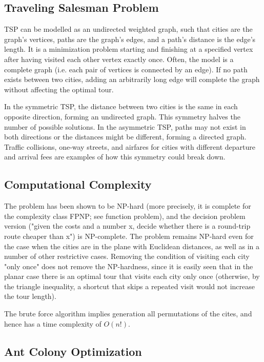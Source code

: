 \subsection{Traveling Salesman Problem}

TSP can be modelled as an undirected weighted graph, such that cities are the graph's vertices, paths are the graph's edges, and a path's distance is the edge's length. It is a minimization problem starting and finishing at a specified vertex after having visited each other vertex exactly once. Often, the model is a complete graph (i.e. each pair of vertices is connected by an edge). If no path exists between two cities, adding an arbitrarily long edge will complete the graph without affecting the optimal tour.

In the symmetric TSP, the distance between two cities is the same in each opposite direction, forming an undirected graph. This symmetry halves the number of possible solutions. In the asymmetric TSP, paths may not exist in both directions or the distances might be different, forming a directed graph. Traffic collisions, one-way streets, and airfares for cities with different departure and arrival fees are examples of how this symmetry could break down.

\subsection{Computational Complexity}

The problem has been shown to be NP-hard (more precisely, it is complete for the complexity class FPNP; see function problem), and the decision problem version ("given the costs and a number x, decide whether there is a round-trip route cheaper than x") is NP-complete. The problem remains NP-hard even for the case when the cities are in the plane with Euclidean distances, as well as in a number of other restrictive cases. Removing the condition of visiting each city "only once" does not remove the NP-hardness, since it is easily seen that in the planar case there is an optimal tour that visits each city only once (otherwise, by the triangle inequality, a shortcut that skips a repeated visit would not increase the tour length).

The brute force algorithm implies generation all permutations of the cites, and hence has a time complexity of $O(n!)$.

\subsection{Ant Colony Optimization}

